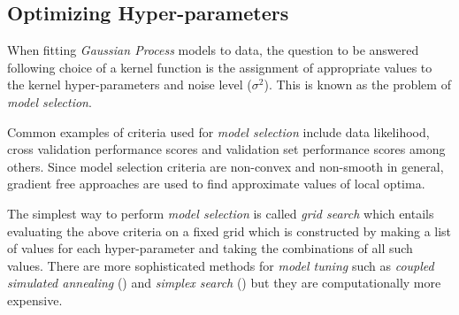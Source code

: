 \documentclass[referee,a4paper,12pt,traditabstract]{swsc}
\begin{document}
\begin{linenumbers}

\subsection{Optimizing Hyper-parameters} \label{sec:hyp}

When fitting \emph{Gaussian Process} models to data, the question to be answered following choice of a kernel function is the assignment of appropriate values to the kernel hyper-parameters and noise level ($\sigma^2$). This is known as the problem of \emph{model selection}.

Common examples of criteria used for \emph{model selection} include data likelihood, cross validation performance scores and validation set performance scores among others. Since model selection criteria are non-convex and non-smooth in general, gradient free approaches are used to find approximate values of local optima.

The simplest way to perform \emph{model selection} is called \emph{grid search} which entails evaluating the above criteria on a fixed grid which is constructed by making a list of values for each hyper-parameter and taking the combinations of all such values. There are more sophisticated methods for \emph{model tuning} such as \emph{coupled simulated annealing} (\citet{Xavier-De-Souza2010}) and \emph{simplex search} (\citet{Nelder1965}) but they are computationally more expensive. 


\end{linenumbers}
\end{document}
